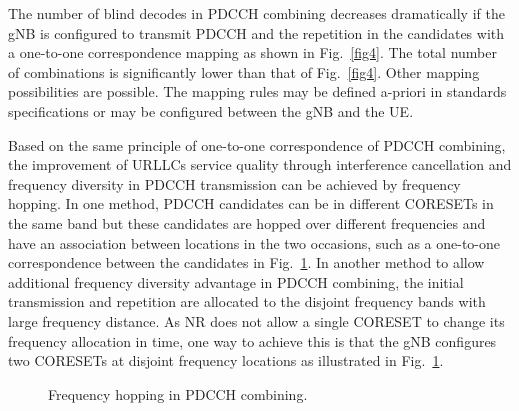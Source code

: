 \documentclass[conference,10pt]{IEEEtran}
\begin{document}
The number of blind decodes in PDCCH combining decreases dramatically if the gNB is configured to transmit PDCCH and the repetition in the candidates with a one-to-one correspondence mapping as shown in Fig.~\ref{fig4}. The total number of combinations is significantly lower than that of Fig.~\ref{fig4}. Other mapping possibilities are possible. The mapping rules may be defined a-priori in standards specifications or may be configured between the gNB and the UE. 

Based on the same principle of one-to-one correspondence of PDCCH
combining, the improvement of URLLC\textquotesingle s service quality through interference cancellation and frequency diversity in PDCCH transmission can be achieved by frequency hopping. In one method, PDCCH candidates can be in different CORESETs in the same band but these candidates are hopped over different frequencies and have an association between locations in the two occasions, such as a one-to-one correspondence between the candidates in Fig.~\ref{fig5}. In another method to allow additional frequency diversity advantage in PDCCH combining, the initial transmission and repetition are allocated to the disjoint frequency bands with large frequency distance. As NR does not allow a single CORESET to change its frequency allocation in time, one way to achieve this is that the gNB configures two CORESETs at disjoint frequency locations as illustrated in Fig.~\ref{fig5}.

\begin{figure}[htbp]
\centering
{}
\hfill
\qquad
{}
\hfill
\caption{Frequency hopping in PDCCH combining.}
\label{fig5}
\end{figure}
\end{document}
